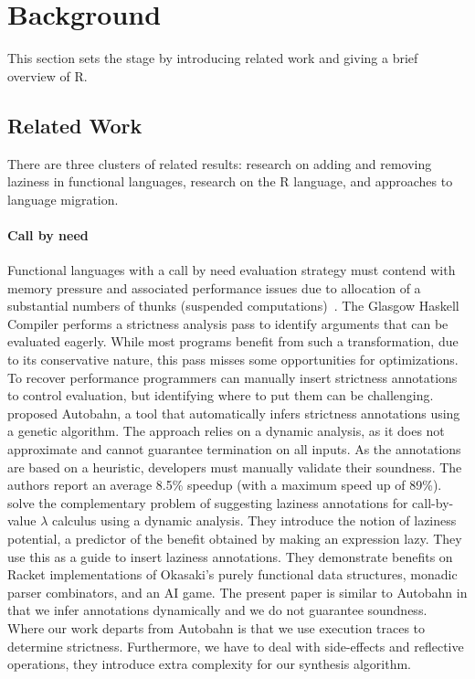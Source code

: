 \documentclass[review,nonacm,screen,acmsmall,anonymous=true]{acmart}
\begin{document}
\section{Background}\label{sec:background}

This section sets the stage by introducing related work and giving a brief
overview of R.

\subsection{Related Work}

There are three clusters of related results: research on adding and removing
laziness in functional languages, research on the R language, and approaches to
language migration.

\paragraph{Call by need}  Functional languages with
a call by need evaluation strategy must contend with memory pressure and
associated performance issues due to allocation of a substantial numbers of thunks
(suspended computations)~\cite{transformopt,stricteffective,opteval}. The
Glasgow Haskell Compiler performs a strictness analysis pass to identify
arguments that can be evaluated eagerly. While most programs benefit from such a
transformation, due to its conservative nature, this pass misses some opportunities
for optimizations. To recover performance programmers can manually insert
strictness annotations to control evaluation, but identifying where to put them
can be challenging. \citet{autobahn} proposed Autobahn, a tool that
automatically infers strictness annotations using a genetic algorithm. The
approach relies on a dynamic analysis, as it does not approximate and cannot
guarantee termination on all inputs. As the annotations are based on a
heuristic, developers must manually validate their soundness. The authors report
an average 8.5\% speedup (with a maximum speed up of 89\%). \citet{lazyprof}
solve the complementary problem of suggesting laziness annotations for
call-by-value $\lambda$ calculus using a dynamic analysis. They introduce the
notion of laziness potential, a predictor of the benefit obtained by making an
expression lazy. They use this as a guide to insert laziness annotations. They
demonstrate benefits on Racket implementations of Okasaki's purely functional
data structures, monadic parser combinators, and an AI game. The present paper
is similar to Autobahn in that we infer annotations dynamically and we do not
guarantee soundness. Where our work departs from Autobahn is that we use
execution traces to determine strictness. Furthermore, we have to deal with
side-effects and reflective operations, they introduce extra complexity for our
synthesis algorithm.
\end{document}
